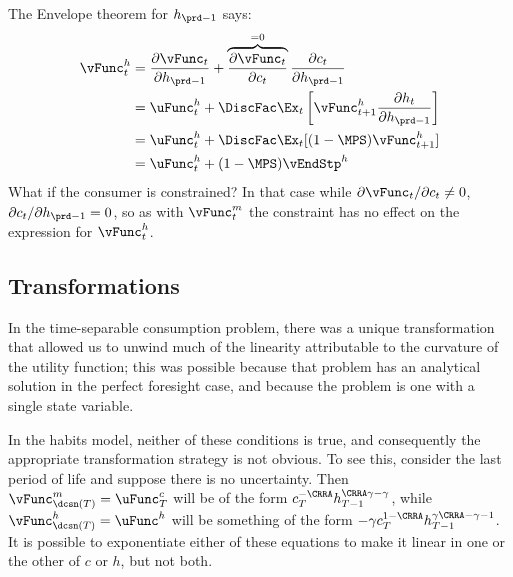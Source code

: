 \documentclass[\econtexRoot/SolvingMicroDSOPs]{subfiles}
\begin{document}
The Envelope theorem for $h_{\prd-1}$ says:
\begin{equation}\begin{gathered}\begin{aligned}
  \vFunc_{t}^{h}  & = \frac{\partial \vFunc_{t}}{\partial h_{\prd-1}} + \overbrace{\frac{\partial \vFunc_{t}}{\partial c_{t}}}^{=0}\frac{\partial c_{t}}{\partial h_{\prd-1}} \nonumber
  \\  & = \uFunc^{h}_{t} + \DiscFac \Ex_{t} \left[{\vFunc}_{t+1}^{h}\frac{\partial h_{t}}{\partial h_{\prd-1}} \right]\nonumber
  \\  & = \uFunc^{h}_{t} + \DiscFac \Ex_{t} [(1-\MPS) \vFunc_{t+1}^{h}] \nonumber
  \\  & = \uFunc^{h}_{t} + (1-\MPS) \vEndStp^{h} \label{eq:vhtformula}
\end{aligned}\end{gathered}\end{equation}
What if the consumer is constrained?  In that case while $\partial
{\vFunc}_{t}/\partial c_{t} \neq 0$, $\partial c_{t}/\partial h_{\prd-1} = 0$, so as
with $\vFunc_{t}^{m}$ the constraint has no effect on the expression for $\vFunc^{h}_{t}$.

\hypertarget{Transforamtions}{}
\subsection{Transformations}

In the time-separable consumption problem, there was a unique
transformation that allowed us to unwind much of the linearity
attributable to the curvature of the utility function; this was
possible because that problem has an analytical solution in the
perfect foresight case, and because the problem is one with a single
state variable.

In the habits model, neither of these conditions is true, and
consequently the appropriate transformation strategy is not obvious.
To see this, consider the last period of life and suppose there is no
uncertainty.  Then $\vFunc_{\dcsn(T)}^m = \uFunc_{T}^{c}$ will be of the form
$c_{T}^{-\CRRA}h_{T-1}^{\CRRA \gamma - \gamma}$, while $\vFunc_{\dcsn(T)}^{h} =
\uFunc^{h}$ will be something of the form $-\gamma
{c}_{T}^{1-\CRRA}h_{T-1}^{\gamma\CRRA-\gamma-1}$.  It is possible to
exponentiate either of these equations to make it linear in one or the
other of $c$ or $h$, but not both.
\end{document}

